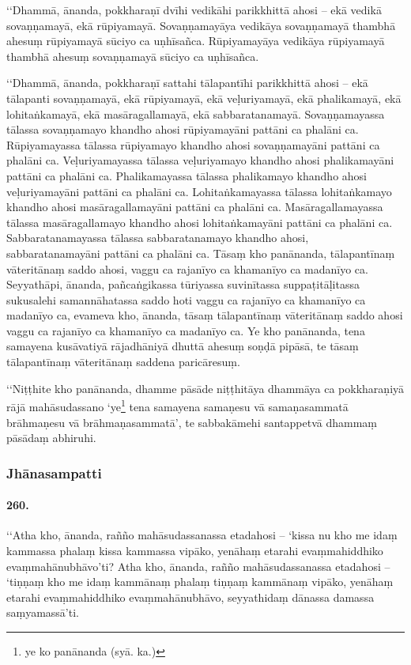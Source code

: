 ‘‘Dhammā, ānanda, pokkharaṇī dvīhi vedikāhi parikkhittā ahosi – ekā vedikā sovaṇṇamayā, ekā rūpiyamayā. Sovaṇṇamayāya vedikāya sovaṇṇamayā thambhā ahesuṃ rūpiyamayā sūciyo ca uṇhīsañca. Rūpiyamayāya vedikāya rūpiyamayā thambhā ahesuṃ sovaṇṇamayā sūciyo ca uṇhīsañca.

‘‘Dhammā, ānanda, pokkharaṇī sattahi tālapantīhi parikkhittā ahosi – ekā tālapanti sovaṇṇamayā, ekā rūpiyamayā, ekā veḷuriyamayā, ekā phalikamayā, ekā lohitaṅkamayā, ekā masāragallamayā, ekā sabbaratanamayā. Sovaṇṇamayassa tālassa sovaṇṇamayo khandho ahosi rūpiyamayāni pattāni ca phalāni ca. Rūpiyamayassa tālassa rūpiyamayo khandho ahosi sovaṇṇamayāni pattāni ca phalāni ca. Veḷuriyamayassa tālassa veḷuriyamayo khandho ahosi phalikamayāni pattāni ca phalāni ca. Phalikamayassa tālassa phalikamayo khandho ahosi veḷuriyamayāni pattāni ca phalāni ca. Lohitaṅkamayassa tālassa lohitaṅkamayo khandho ahosi masāragallamayāni pattāni ca phalāni ca. Masāragallamayassa tālassa masāragallamayo khandho ahosi lohitaṅkamayāni pattāni ca phalāni ca. Sabbaratanamayassa tālassa sabbaratanamayo khandho ahosi, sabbaratanamayāni pattāni ca phalāni ca. Tāsaṃ kho panānanda, tālapantīnaṃ vāteritānaṃ saddo ahosi, vaggu ca rajanīyo ca khamanīyo ca madanīyo ca. Seyyathāpi, ānanda, pañcaṅgikassa tūriyassa suvinītassa suppaṭitāḷitassa sukusalehi samannāhatassa saddo hoti vaggu ca rajanīyo ca khamanīyo ca madanīyo ca, evameva kho, ānanda, tāsaṃ tālapantīnaṃ vāteritānaṃ saddo ahosi vaggu ca rajanīyo ca khamanīyo ca madanīyo ca. Ye kho panānanda, tena samayena kusāvatiyā rājadhāniyā dhuttā ahesuṃ soṇḍā pipāsā, te tāsaṃ tālapantīnaṃ vāteritānaṃ saddena paricāresuṃ.

‘‘Niṭṭhite kho panānanda, dhamme pāsāde niṭṭhitāya dhammāya ca pokkharaṇiyā rājā mahāsudassano ‘ye\footnote{ye ko panānanda (syā. ka.)} tena samayena samaṇesu vā samaṇasammatā brāhmaṇesu vā brāhmaṇasammatā’, te sabbakāmehi santappetvā dhammaṃ pāsādaṃ abhiruhi.


\subsubsection{Jhānasampatti}

\paragraph{260.} ‘‘Atha kho, ānanda, rañño mahāsudassanassa etadahosi – ‘kissa nu kho me idaṃ kammassa phalaṃ kissa kammassa vipāko, yenāhaṃ etarahi evaṃmahiddhiko evaṃmahānubhāvo’ti? Atha kho, ānanda, rañño mahāsudassanassa etadahosi – ‘tiṇṇaṃ kho me idaṃ kammānaṃ phalaṃ tiṇṇaṃ kammānaṃ vipāko, yenāhaṃ etarahi evaṃmahiddhiko evaṃmahānubhāvo, seyyathidaṃ dānassa damassa saṃyamassā’ti.

